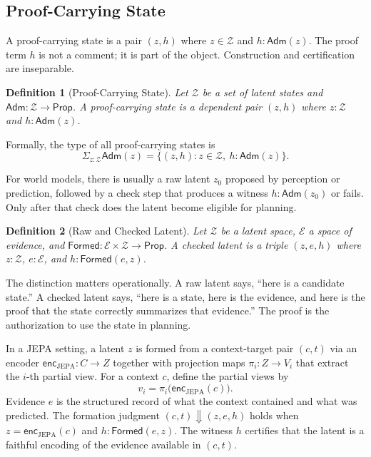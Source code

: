 \documentclass[12pt, a4paper]{article}
\newtheorem{definition}{Definition}[section]
\begin{document}
\subsection{Proof-Carrying State}

A proof-carrying state is a pair $(z, h)$ where $z \in \mathcal{Z}$ and
$h : \mathsf{Adm}(z)$. The proof term $h$ is not a comment; it is part of the
object. Construction and certification are inseparable.

\begin{definition}[Proof-Carrying State]
Let $\mathcal{Z}$ be a set of latent states and $\mathsf{Adm} : \mathcal{Z} \to
\mathsf{Prop}$. A proof-carrying state is a dependent pair $(z, h)$ where
$z : \mathcal{Z}$ and $h : \mathsf{Adm}(z)$.
\end{definition}

Formally, the type of all proof-carrying states is
\[
  \Sigma_{z : \mathcal{Z}} \mathsf{Adm}(z) = \{ (z, h) : z \in \mathcal{Z},\
  h : \mathsf{Adm}(z) \}.
\]

For world models, there is usually a raw latent $z_0$ proposed by perception or
prediction, followed by a check step that produces a witness $h : \mathsf{Adm}(z_0)$
or fails. Only after that check does the latent become eligible for planning.

\begin{definition}[Raw and Checked Latent]
Let $\mathcal{Z}$ be a latent space, $\mathcal{E}$ a space of evidence, and
$\mathsf{Formed} : \mathcal{E} \times \mathcal{Z} \to \mathsf{Prop}$. A checked
latent is a triple $(z, e, h)$ where $z : \mathcal{Z}$, $e : \mathcal{E}$, and
$h : \mathsf{Formed}(e, z)$.
\end{definition}

The distinction matters operationally. A raw latent says, ``here is a candidate
state.'' A checked latent says, ``here is a state, here is the evidence, and
here is the proof that the state correctly summarizes that evidence.'' The proof
is the authorization to use the state in planning.

In a JEPA setting, a latent $z$ is formed from a context-target pair $(c, t)$
via an encoder $\mathsf{enc}_{\mathrm{JEPA}} : C \to Z$ together with
projection maps $\pi_i : Z \to V_i$ that extract the $i$-th partial view. For
a context $c$, define the partial views by
\[
  v_i = \pi_i\bigl(\mathsf{enc}_{\mathrm{JEPA}}(c)\bigr).
\]
Evidence $e$ is the structured record of what the context contained and what was
predicted. The formation judgment $(c, t) \Downarrow (z, e, h)$ holds when
$z = \mathsf{enc}_{\mathrm{JEPA}}(c)$ and $h : \mathsf{Formed}(e, z)$. The witness $h$
certifies that the latent is a faithful encoding of the evidence available in
$(c, t)$.
\end{document}
